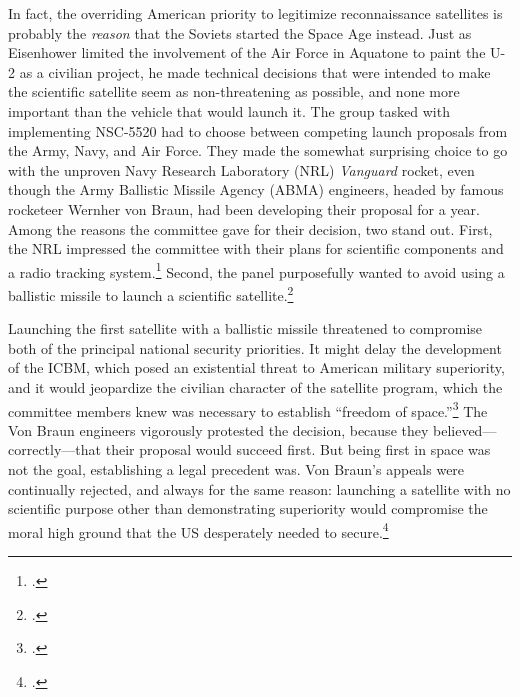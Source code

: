 \documentclass{report}
\begin{document}
In fact, the overriding American priority to legitimize reconnaissance satellites is probably the \emph{reason} that the Soviets started the Space Age instead. Just as Eisenhower limited the involvement of the Air Force in Aquatone to paint the U-2 as a civilian project, he made technical decisions that were intended to make the scientific satellite seem as non-threatening as possible, and none more important than the vehicle that would launch it. The group tasked with implementing NSC-5520 had to choose between competing launch proposals from the Army, Navy, and Air Force. They made the somewhat surprising choice to go with the unproven Navy Research Laboratory (NRL) \emph{Vanguard} rocket, even though the Army Ballistic Missile Agency (ABMA) engineers, headed by famous rocketeer Wernher von Braun, had been developing their proposal for a year. Among the reasons the committee gave for their decision, two stand out. First, the NRL impressed the committee with their plans for scientific components and a radio tracking system.\footcite[p.~122]{mcdougall_heavens_1985} Second, the panel purposefully wanted to avoid using a ballistic missile to launch a scientific satellite.\footcite[p.~129. Though the NRL is run by the Navy, it functions like a civilian scientific operation. Everything that I have read about this decision seems to take it for granted that despite the Navy involement, the NRL proposal would be seen as a civilian project. This makes sense to me, especially when you consider that it was competiting with the same agency that was building nuclear delivery systems.]{day_eye_2015}

Launching the first satellite with a ballistic missile threatened to compromise both of the principal national security priorities. It might delay the development of the ICBM, which posed an existential threat to American military superiority, and it would jeopardize the civilian character of the satellite program, which the committee members knew was necessary to establish ``freedom of space.''\footcite[p.~122]{mcdougall_heavens_1985} The Von Braun engineers vigorously protested the decision, because they believed---correctly---that their proposal would succeed first. But being first in space was not the goal, establishing a legal precedent was. Von Braun's appeals were continually rejected, and always for the same reason: launching a satellite with no scientific purpose other than demonstrating superiority would compromise the moral high ground that the US desperately needed to secure.\footcite[p.~131]{day_eye_2015}
\end{document}

